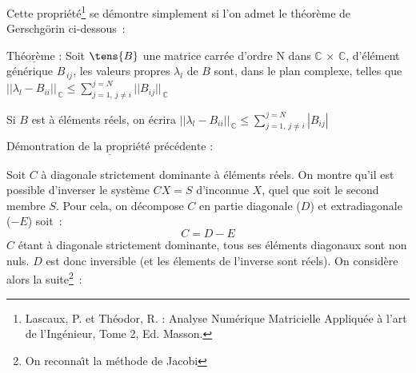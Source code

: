 Cette propri\'et\'e\footnote{Lascaux, P. et Th\'{e}odor,
R. : Analyse Num\'{e}rique Matricielle Appliqu\'{e}e \`{a} l'art de l'Ing\'{e}nieur, Tome 2,
Ed. Masson.} se d\'emontre simplement si l'on admet le th\'eor\`eme de
Gerschg\"orin ci-dessous~:

$\underline{\text{Th\'eor\`eme~:}}$
Soit $\tens{B}$ une matrice carr\'ee d'ordre N dans $\mathbb{C}\,\times\,\mathbb{C}$,
d'\'el\'ement g\'en\'erique $B_{\,ij}$, les valeurs propres $\lambda_l$ de $B$ sont, dans
le plan complexe, telles que
$||\lambda_l - B_{ii}||_{\,\mathbb{C}} \leqslant \sum\limits_{j=1,\,j\neq
i}^{j=N}{||B_{ij}||_{\,\mathbb{C}}}$

Si $B$ est \`a \'el\'ements r\'eels, on \'ecrira $||\lambda_l - B_{ii}||_{\,\mathbb{C}}
\leqslant \sum\limits_{j=1,\,j\neq i}^{j=N}|B_{ij}|$

$\underline{\text{D\'emontration de la propri\'et\'e pr\'ec\'edente~:}}$

Soit $C$ \`a diagonale strictement dominante \`a \'el\'ements r\'eels.
On montre qu'il est possible
d'inverser le syst\`eme $CX=S$ d'inconnue $X$, quel que soit le second membre
$S$. Pour cela, on d\'ecompose $C$ en partie
diagonale ($D$) et extradiagonale ($-E$) soit~:
$$C=D-E$$
$C$ \'etant \`a diagonale strictement dominante, tous
ses \'el\'ements diagonaux sont non nuls. $D$ est donc inversible (et
les \'elements de l'inverse sont r\'eels). On
consid\`ere alors la suite\footnote{On reconna\^\i t la m\'ethode de Jacobi}~:

